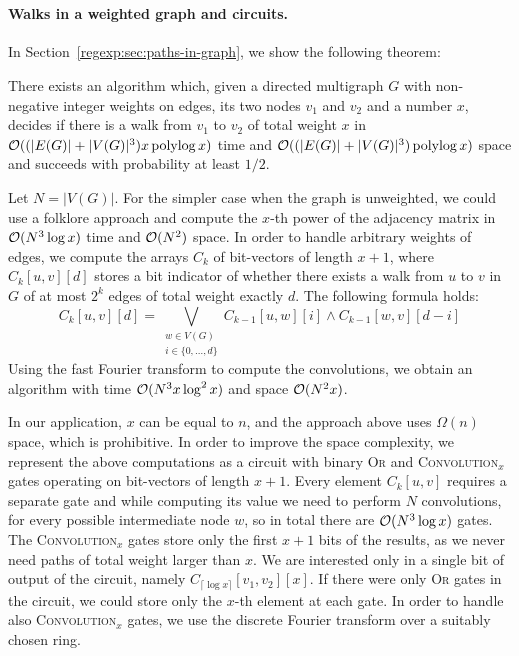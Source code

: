 \\

\paragraph{Walks in a weighted graph and circuits.} In Section~\ref{regexp:sec:paths-in-graph}, we show the following theorem:

\begin{thm}\label{thm:detecting_walk_specific_weight}
 There exists an algorithm which, given a directed multigraph $G$ with non-negative integer weights on edges, its two nodes $v_1$ and $v_2$ and a number $x$,  decides if there is a walk from $v_1$ to $v_2$ of total weight $x$ in~$\mathcal{O}((|E(G)|+|V(G)|^3)x\operatorname{polylog} x)$ time and $\mathcal{O}((|E(G)|+|V(G)|^3)\operatorname{polylog} x)$ space and succeeds with probability at least $1/2$.
\end{thm}

Let $N=|V(G)|$.
For the simpler case when the graph is unweighted, we could use a folklore approach and compute the $x$-th power of the adjacency matrix in $\mathcal{O}(N^3\log x)$ time and $\mathcal{O}(N^2)$ space.
In order to handle arbitrary weights of edges, we compute the arrays $C_k$ of bit-vectors of length $x+1$, where $C_k[u,v][d]$ stores a bit indicator of whether there exists a walk from $u$ to $v$ in $G$ of at most $2^k$ edges of total weight exactly $d$. The following formula holds:
$$C_k[u,v][d]=\bigvee_{\substack{w\in V(G) \\  i\in \{0,\ldots,d\}}} C_{k-1}[u,w][i] \wedge C_{k-1}[w,v][d-i]$$
Using the fast Fourier transform to compute the convolutions, we obtain an algorithm with time $\mathcal{O}(N^3x\log^2x)$ and space $\mathcal{O}(N^2x)$. 

In our application, $x$ can be equal to $n$, and the approach above uses $\Omega(n)$ space, which is prohibitive. 
In order to improve the space complexity, we represent the above computations as a circuit with binary \textsc{Or} and \textsc{Convolution}$_x$ gates operating on bit-vectors of length $x+1$.
Every element $C_k[u,v]$ requires a separate gate and while computing its value we need to perform $N$ convolutions, for every possible intermediate node $w$, so in total there are $\mathcal{O}(N^3\log x)$ gates.
The \textsc{Convolution}$_x$ gates store only the first $x+1$ bits of the results, as we never need paths of total weight larger than $x$.
We are interested only in a single bit of output of the circuit, namely $C_{\lceil\log x\rceil}[v_1,v_2][x]$. If there were only \textsc{Or} gates in the circuit, we could store only the $x$-th element at each gate.
In order to handle also \textsc{Convolution}$_x$ gates, we use the discrete Fourier transform over a suitably chosen ring.

